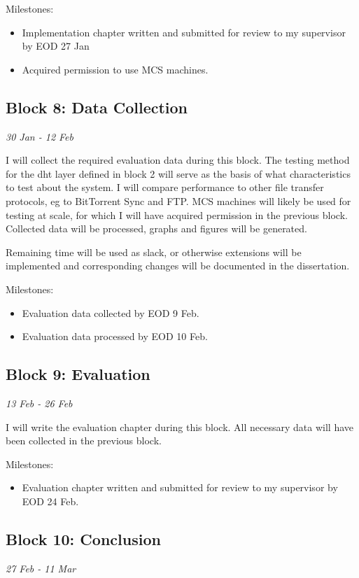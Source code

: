 \documentclass[12pt]{article}
\begin{document}
Milestones:
\begin{itemize}
\item{Implementation chapter written and submitted for review to my supervisor by EOD 27 Jan}
\item{Acquired permission to use MCS machines.}
\end{itemize}


\subsection{Block 8: Data Collection}
\emph{30 Jan - 12 Feb} %

I will collect the required evaluation data during this block. The testing method for the \gls{dht} layer defined in block 2 will serve as the basis of what characteristics to test about the system. I will compare performance to other file transfer protocols, eg to BitTorrent Sync and FTP. MCS machines will likely be used for testing at scale, for which I will have acquired permission in the previous block. Collected data will be processed, graphs and figures will be generated.

Remaining time will be used as slack, or otherwise extensions will be implemented and corresponding changes will be documented in the dissertation.

Milestones:
\begin{itemize}
\item{Evaluation data collected by EOD 9 Feb.}
\item{Evaluation data processed by EOD 10 Feb.}
\end{itemize}

\subsection{Block 9: Evaluation}
\emph{13 Feb - 26 Feb} %

I will write the evaluation chapter during this block. All necessary data will have been collected in the previous block.

Milestones:
\begin{itemize}
\item{Evaluation chapter written and submitted for review to my supervisor by EOD 24 Feb.}

\end{itemize}

\subsection{Block 10: Conclusion}
\emph{27 Feb - 11 Mar} %
\end{document}
